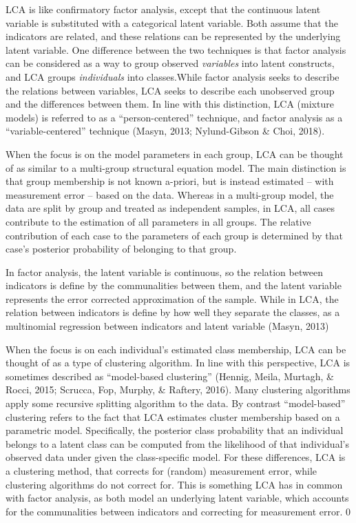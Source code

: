 \documentclass[
  ,man,floatsintext]{apa6}
\begin{document}
LCA is like confirmatory factor analysis, except that the continuous
latent variable is substituted with a categorical latent variable. Both
assume that the indicators are related, and these relations can be
represented by the underlying latent variable. One difference between
the two techniques is that factor analysis can be considered as a way to
group observed \emph{variables} into latent constructs, and LCA groups
\emph{individuals} into classes.While factor analysis seeks to describe the
relations between variables, LCA seeks to describe each unobserved group
and the differences between them. In line with this distinction, LCA
(mixture models) is referred to as a ``person-centered'' technique, and
factor analysis as a ``variable-centered'' technique
(Masyn, 2013; Nylund-Gibson \& Choi, 2018).

When the focus is on the model parameters in each group, LCA can be
thought of as similar to a multi-group structural equation model. The
main distinction is that group membership is not known a-priori, but is
instead estimated -- with measurement error -- based on the data.
Whereas in a multi-group model, the data are split by group and treated
as independent samples, in LCA, all cases contribute to the estimation
of all parameters in all groups. The relative contribution of each case
to the parameters of each group is determined by that case's posterior
probability of belonging to that group.

In factor analysis, the latent variable is continuous, so the relation
between indicators is define by the communalities between them, and the
latent variable represents the error corrected approximation of the
sample. While in LCA, the relation between indicators is define by how
well they separate the classes, as a multinomial regression between
indicators and latent variable (Masyn, 2013)

When the focus is on each individual's estimated class membership, LCA
can be thought of as a type of clustering algorithm. In line with this
perspective, LCA is sometimes described as ``model-based clustering''
(Hennig, Meila, Murtagh, \& Rocci, 2015; Scrucca, Fop, Murphy, \& Raftery, 2016). Many clustering
algorithms apply some recursive splitting algorithm to the data. By
contrast ``model-based'' clustering refers to the fact that LCA estimates
cluster membership based on a parametric model. Specifically, the
posterior class probability that an individual belongs to a latent class
can be computed from the likelihood of that individual's observed data
under given the class-specific model. For these differences, LCA is a clustering method, that corrects for (random) measurement error, while clustering algorithms do not correct for. This is something LCA has in common with factor analysis, as both model an underlying latent variable, which accounts for the communalities between indicators and correcting for measurement error. 0
\end{document}
